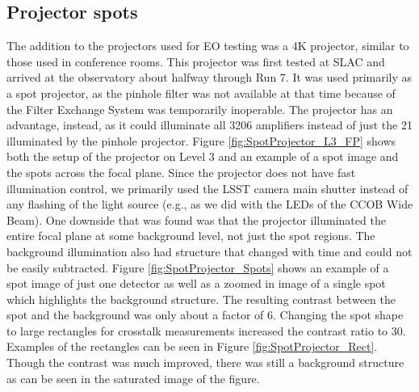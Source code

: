 \subsection{Projector spots}\label{projector-spots}
The addition to the projectors used for EO testing was a 4K
projector, similar to those used in conference rooms. This projector was
first tested at SLAC and arrived at the observatory about halfway through Run 7.
It was used primarily as a spot projector, as the pinhole filter
was not available at that time because of the Filter Exchange System was temporarily inoperable. The projector has an advantage, instead, as it could
illuminate all 3206 amplifiers instead of just the 21 illuminated by the
pinhole projector. Figure \ref{fig:SpotProjector_L3_FP} shows both the setup of the projector on Level 3 and an example of a spot image and the spots across the focal plane. Since the projector does not have fast illumination control, we primarily used the LSST camera main shutter instead of any flashing of the light source (e.g., as we did with the LEDs of the CCOB Wide Beam). One
downside that was found was that the projector illuminated the entire focal plane at some background level, not just the spot regions. The background illumination also had
structure that changed with time and could not be easily subtracted. Figure \ref{fig:SpotProjector_Spots} shows an example of a spot image of just one detector as well as a zoomed in image of a single spot which highlights the background structure. The resulting contrast between the spot and the background was only about a factor of 6. Changing the spot shape to large rectangles for crosstalk
measurements increased the contrast ratio to 30. Examples of the rectangles can be seen in Figure \ref{fig:SpotProjector_Rect}. Though the contrast was much improved, there was still a background structure as can be seen in the saturated image of the figure.

